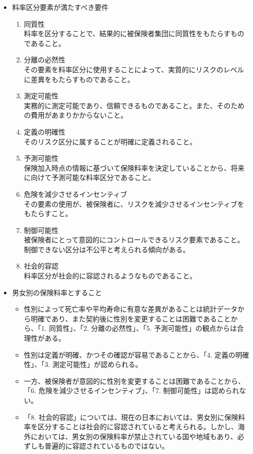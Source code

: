 \documentclass[report,gutter=10mm,fore-edge=10mm,uplatex,dvipdfmx]{jlreq}
\begin{document}
\begin{itemize}
\tightlist
\item
  料率区分要素が満たすべき要件

  \begin{enumerate}
  \tightlist
  \item
    同質性\\
    料率を区分することで、結果的に被保険者集団に同質性をもたらすものであること。
  \item
    分離の必然性\\
    その要素を料率区分に使用することによって、実質的にリスクのレベルに差異をもたらすものであること。
  \item
    測定可能性\\
    実務的に測定可能であり、信頼できるものであること。また、そのための費用があまりかからないこと。
  \item
    定義の明確性\\ そのリスク区分に属することが明確に定義されること。
  \item
    予測可能性\\
    保険加入時点の情報に基づいて保険料率を決定していることから、将来に向けて予測可能な料率区分であること。
  \item
    危険を減少させるインセンティブ\\
    その要素の使用が、被保険者に、リスクを減少させるインセンティブをもたらすこと。
  \item
    制御可能性\\
    被保険者にとって意図的にコントロールできるリスク要素であること。制御できない区分は不公平と考えられる傾向がある。
  \item
    社会的容認\\ 料率区分が社会的に容認されるようなものであること。
  \end{enumerate}
\item
  男女別の保険料率とすること

  \begin{itemize}
  \tightlist
  \item
    性別によって死亡率や平均寿命に有意な差異があることは統計データから明確であり、また契約後に性別を変更することは困難であることから、「1.
    同質性」、「2. 分離の必然性」、「5.
    予測可能性」の観点からは合理性がある。
  \item
    性別は定義が明確、かつその確認が容易であることから、「4.
    定義の明確性」、「3. 測定可能性」が認められる。
  \item
    一方、被保険者が意図的に性別を変更することは困難であることから、「6.
    危険を減少させるインセンティブ」、「7. 制御可能性」は認められない。
  \item
    「8.
    社会的容認」については、現在の日本においては、男女別に保険料率を区分することは社会的に容認されていると考えられる。しかし、海外においては、男女別の保険料率が禁止されている国や地域もあり、必ずしも普遍的に容認されているものではない。
  \end{itemize}
\end{itemize}
\end{document}

